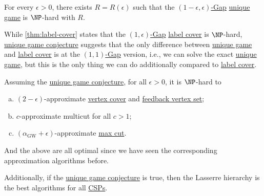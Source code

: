 \begin{conjecture}\label{conj:unique-game}
	For every \(\epsilon > 0\), there exists \(R = R(\epsilon )\) such that the \hyperref[def:c-s-Gap]{\((1-\epsilon , \epsilon )\)-Gap} \hyperref[prb:unique-game]{unique game} is \(\NP\)-hard with \(R\).
\end{conjecture}

While \autoref{thm:label-cover} states that the \hyperref[def:c-s-Gap]{\((1, \epsilon )\)-Gap} \hyperref[prb:label-cover]{label cover} is \(\NP\)-hard, \hyperref[conj:unique-game]{unique game conjecture} suggests that the only difference between \hyperref[prb:unique-game]{unique game} and \hyperref[prb:label-cover]{label cover} is at the \hyperref[def:c-s-Gap]{\((1, 1)\)-Gap} version, i.e., we can solve the exact \hyperref[prb:unique-game]{unique game}, but this is the only thing we can do additionally compared to \hyperref[prb:label-cover]{label cover}.

\begin{remark}
	Assuming the \hyperref[conj:unique-game]{unique game conjecture}, for all \(\epsilon > 0\), it is \(\NP\)-hard to
	\begin{enumerate}[(a)]
		\item \((2-\epsilon )\)-approximate \hyperref[prb:vertex-cover]{vertex cover} and \hyperref[prb:feedback-vertex-set]{feedback vertex set};
		\item \(c\)-approximate multicut for all \(c > 1\);
		\item \((\alpha _{\mathrm{GW} } + \epsilon )\)-approximate \hyperref[prb:max-cut]{max cut}.
	\end{enumerate}
	And the above are all optimal since we have seen the corresponding approximation algorithms before.
\end{remark}

Additionally, if the \hyperref[conj:unique-game]{unique game conjecture} is true, then the Lasserre hierarchy is the best algorithms for all \hyperref[prb:CSP]{CSPs}.